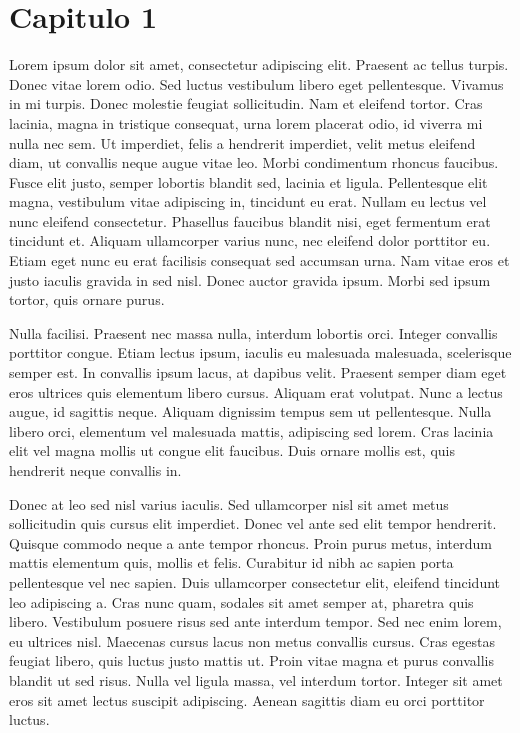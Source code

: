 \documentclass{ufbathesis}
\begin{document}
\chapter{Capitulo 1}

Lorem ipsum dolor sit amet, consectetur adipiscing elit. Praesent ac tellus turpis. Donec vitae lorem odio. Sed luctus vestibulum libero eget pellentesque. Vivamus in mi turpis. Donec molestie feugiat sollicitudin. Nam et eleifend tortor. Cras lacinia, magna in tristique consequat, urna lorem placerat odio, id viverra mi nulla nec sem. Ut imperdiet, felis a hendrerit imperdiet, velit metus eleifend diam, ut convallis neque augue vitae leo. Morbi condimentum rhoncus faucibus. Fusce elit justo, semper lobortis blandit sed, lacinia et ligula. Pellentesque elit magna, vestibulum vitae adipiscing in, tincidunt eu erat. Nullam eu lectus vel nunc eleifend consectetur. Phasellus faucibus blandit nisi, eget fermentum erat tincidunt et. Aliquam ullamcorper varius nunc, nec eleifend dolor porttitor eu. Etiam eget nunc eu erat facilisis consequat sed accumsan urna. Nam vitae eros et justo iaculis gravida in sed nisl. Donec auctor gravida ipsum. Morbi sed ipsum tortor, quis ornare purus.

Nulla facilisi. Praesent nec massa nulla, interdum lobortis orci. Integer convallis porttitor congue. Etiam lectus ipsum, iaculis eu malesuada malesuada, scelerisque semper est. In convallis ipsum lacus, at dapibus velit. Praesent semper diam eget eros ultrices quis elementum libero cursus. Aliquam erat volutpat. Nunc a lectus augue, id sagittis neque. Aliquam dignissim tempus sem ut pellentesque. Nulla libero orci, elementum vel malesuada mattis, adipiscing sed lorem. Cras lacinia elit vel magna mollis ut congue elit faucibus. Duis ornare mollis est, quis hendrerit neque convallis in.

Donec at leo sed nisl varius iaculis. Sed ullamcorper nisl sit amet metus sollicitudin quis cursus elit imperdiet. Donec vel ante sed elit tempor hendrerit. Quisque commodo neque a ante tempor rhoncus. Proin purus metus, interdum mattis elementum quis, mollis et felis. Curabitur id nibh ac sapien porta pellentesque vel nec sapien. Duis ullamcorper consectetur elit, eleifend tincidunt leo adipiscing a. Cras nunc quam, sodales sit amet semper at, pharetra quis libero. Vestibulum posuere risus sed ante interdum tempor. Sed nec enim lorem, eu ultrices nisl. Maecenas cursus lacus non metus convallis cursus. Cras egestas feugiat libero, quis luctus justo mattis ut. Proin vitae magna et purus convallis blandit ut sed risus. Nulla vel ligula massa, vel interdum tortor. Integer sit amet eros sit amet lectus suscipit adipiscing. Aenean sagittis diam eu orci porttitor luctus.
\end{document}
